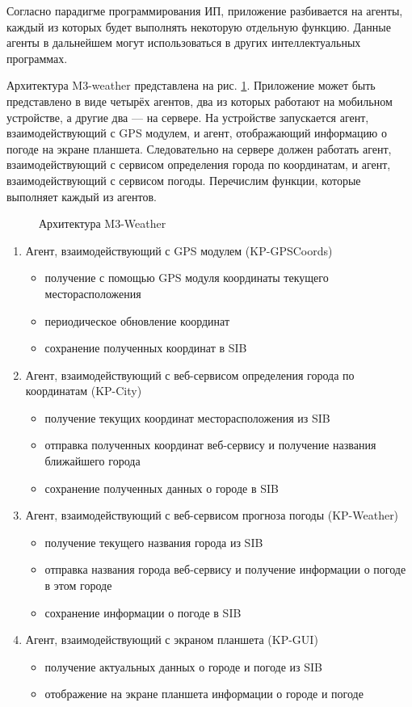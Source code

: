 Согласно парадигме программирования ИП, приложение разбивается
на агенты, каждый из которых будет выполнять некоторую отдельную функцию.
Данные агенты в дальнейшем могут использоваться в других интеллектуальных
программах.

Архитектура M3-weather представлена на рис. \ref{m3w-arch}. Приложение может быть представлено в виде четырёх
агентов, два из которых работают на мобильном устройстве, а другие два — на
сервере. На устройстве запускается агент, взаимодействующий с GPS модулем, и агент, отображающий информацию о погоде на экране планшета. Следовательно на сервере должен работать агент, взаимодействующий с сервисом определения города по координатам, и агент, взаимодействующий с сервисом погоды. Перечислим функции, которые выполняет каждый из агентов.
\begin{figure}[h]
\centerline{
}
\caption{Архитектура M3-Weather}
\label{m3w-arch}
\end{figure}
\newpage
\begin{enumerate}
\item
Агент, взаимодействующий с GPS модулем (KP-GPSCoords)
\begin{itemize}
\item
получение с помощью GPS модуля координаты текущего месторасположения
\item
периодическое обновление координат
\item
сохранение полученных координат в SIB
\end{itemize}
\item
Агент, взаимодействующий с веб-сервисом определения города по координатам (KP-City)
\begin{itemize}
\item
получение текущих координат месторасположения из SIB
\item
отправка полученных координат веб-сервису и получение названия ближайшего города
\item
сохранение полученных данных о городе в SIB
\end{itemize}
\item
Агент, взаимодействующий с веб-сервисом прогноза погоды (KP-Weather)
\begin{itemize}
\item
получение текущего названия города из SIB
\item
отправка названия города веб-сервису и получение информации о погоде в этом городе
\item       
сохранение информации о погоде в SIB
\end{itemize}
\item
Агент, взаимодействующий с экраном планшета (KP-GUI)
\begin{itemize}
\item
получение актуальных данных о городе и погоде из SIB
\item
отображение на экране планшета информации о городе и погоде
\end{itemize}
\end{enumerate}

